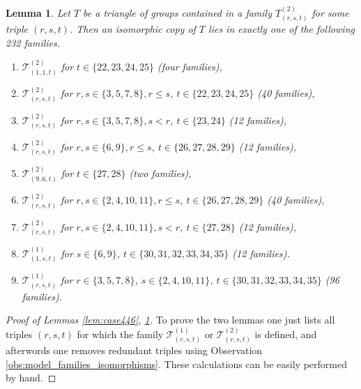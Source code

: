 \documentclass[dvipsnames]{article}
\newtheorem{lemma}[theorem]{Lemma}
\theoremstyle{definition}
\theoremstyle{remark}
\begin{document}
    \begin{lemma}\label{lem:case664}
        Let $T$ be a triangle of groups contained in a family $T_{(r,s,t)}^{(2)}$ for some triple $(r,s,t)$. Then an isomorphic copy of $T$ lies in exactly one of the following 232 families.
        \begin{enumerate}
            \item $\mathcal T_{(1,1,t)}^{(2)}$ for $t \in \{22,23,24,25\}$ (four families),
            \item $\mathcal T_{(r,s,t)}^{(2)}$ for $r,s \in \{3,5,7,8\}, r \leq s$, $t \in \{22,23,24,25\}$ (40 families),
            \item $\mathcal T_{(r,s,t)}^{(2)}$ for $r,s \in \{3,5,7,8\}, s < r$, $t \in \{23,24\}$ (12 families),
            \item $\mathcal T_{(r,s,t)}^{(2)}$ for $r,s \in \{6,9\}, r \leq s$, $t \in \{26,27,28,29\}$ (12 families),
            \item $\mathcal T_{(9,6,t)}^{(2)}$ for $t \in \{27,28\}$ (two families),
            \item $\mathcal T_{(r,s,t)}^{(2)}$ for $r,s \in \{2,4,10,11\}, r \leq s$, $t \in \{26,27,28,29\}$ (40 families),
            \item $\mathcal T_{(r,s,t)}^{(2)}$ for $r,s \in \{2,4,10,11\}, s < r$, $t \in \{27,28\}$ (12 families),
            \item $\mathcal T_{(1,s,t)}^{(1)}$ for $s \in \{6,9\}$, $t \in \{30,31,32,33,34,35\}$ (12 families).
            \item $\mathcal T_{(r,s,t)}^{(1)}$ for $r\in \{3,5,7,8\}$, $s \in \{2,4,10,11\}$, $t \in \{30,31,32,33,34,35\}$ (96 families).
        \end{enumerate}
    \end{lemma}

    \begin{proof}[Proof of Lemmas \ref{lem:case446}, \ref{lem:case664}]
        To prove the two lemmas one just lists all triples $(r,s,t)$ for which the family $\mathcal T_{(r,s,t)}^{(1)}$ or $\mathcal T_{(r,s,t)}^{(2)}$ is defined, and afterwords one removes redundant triples using Observation \ref{obs:model_families_isomorphisms}. These calculations can be easily performed by hand.
    \end{proof}
\end{document}
